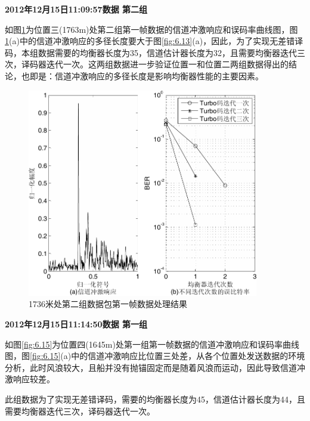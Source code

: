 \textbf{\sihao 2012年12月15日11:09:57数据 第二组} 

如图\ref{fig:6.14}为位置三(1763m)处第二组第一帧数据的信道冲激响应和误码率曲线图，图\ref{fig:6.14}(a)中的信道冲激响应的多径长度要大于图\ref{fig:6.13}(a)，因此，为了实现无差错译码，本组数据需要的均衡器长度为35，信道估计器长度为32，且需要均衡器迭代三次，译码器迭代一次。这两组数据进一步验证位置一和位置二两组数据得出的结论，也即是：信道冲激响应的多径长度是影响均衡器性能的主要因素。

\begin{figure}[htb]
  \begin{center}
    \includegraphics[width=0.9\textwidth]{images/result_3_2.pdf}
  \end{center}
  \caption{1736米处第二组数据包第一帧数据处理结果}
  \label{fig:6.14}
\end{figure}

\textbf{\sihao 2012年12月15日11:14:50数据 第一组} 

如图\ref{fig:6.15}为位置四(1645m)处第一组第一帧数据的信道冲激响应和误码率曲线图，图\ref{fig:6.15}(a)中的信道冲激响应比位置三处差，从各个位置处发送数据的环境分析，此时风浪较大，且船并没有抛锚固定而是随着风浪而运动，因此导致信道冲激响应较差。

此组数据为了实现无差错译码，需要的均衡器长度为45，信道估计器长度为44，且需要均衡器迭代三次，译码器迭代一次。

